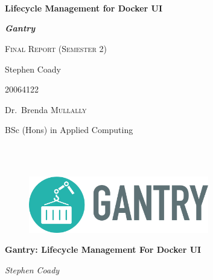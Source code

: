 \begin{titlepage}
	\centering
	\mbox{}\\
	\mbox{}\\
	\mbox{}\\
	{\huge\bfseries Lifecycle Management for Docker UI \par}
	{\Large\bfseries \textit{Gantry}\par}
	\vspace{1cm}
	{\scshape\large Final Report (Semester 2)\par}
	\vspace{3cm}
	{\Large Stephen Coady\par}
	{\Large 20064122\par}
	\vspace{3cm}\par
	\vfill
	{\Large Dr.~Brenda \textsc{Mullally}}
	\vspace{1cm}\par
	{\Large BSc (Hons) in Applied Computing\par}


	\vfill
	
	\clearpage
	\thispagestyle{empty}
	\centering
	\mbox{}\\
	\mbox{}\\
	\begin{figure}[!ht]
	\centering
	\includegraphics*[width=0.7\textwidth]{images/gantry-single-darktext}
	\label{fig:gantry-single-darktext}
	\end{figure}
	
	{\huge\bfseries Gantry: Lifecycle Management For Docker UI \par}
	\vspace{1cm}
	{\Large \textit{Stephen Coady}\par}
	\vspace{3cm}\par
	\vfill
	\vspace{1cm}\par


	\vfill
\end{titlepage}
